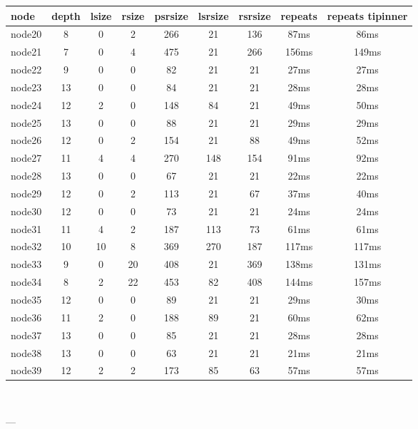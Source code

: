 \begin{tabular}{|l|c|c|c|c|c|c|c|c|}
\hline node & depth & lsize & rsize & psrsize & lsrsize & rsrsize   & repeats & repeats tipinner\\
    \hline node20 & 8 & 0 & 2 & 266 & 21 & 136 & 87ms & 86ms\\
    \hline node21 & 7 & 0 & 4 & 475 & 21 & 266 & 156ms & 149ms\\
    \hline node22 & 9 & 0 & 0 & 82 & 21 & 21 & 27ms & 27ms\\
    \hline node23 & 13 & 0 & 0 & 84 & 21 & 21 & 28ms & 28ms\\
    \hline node24 & 12 & 2 & 0 & 148 & 84 & 21 & 49ms & 50ms\\
    \hline node25 & 13 & 0 & 0 & 88 & 21 & 21 & 29ms & 29ms\\
    \hline node26 & 12 & 0 & 2 & 154 & 21 & 88 & 49ms & 52ms\\
    \hline node27 & 11 & 4 & 4 & 270 & 148 & 154 & 91ms & 92ms\\
    \hline node28 & 13 & 0 & 0 & 67 & 21 & 21 & 22ms & 22ms\\
    \hline node29 & 12 & 0 & 2 & 113 & 21 & 67 & 37ms & 40ms\\
    \hline node30 & 12 & 0 & 0 & 73 & 21 & 21 & 24ms & 24ms\\
    \hline node31 & 11 & 4 & 2 & 187 & 113 & 73 & 61ms & 61ms\\
    \hline node32 & 10 & 10 & 8 & 369 & 270 & 187 & 117ms & 117ms\\
    \hline node33 & 9 & 0 & 20 & 408 & 21 & 369 & 138ms & 131ms\\
    \hline node34 & 8 & 2 & 22 & 453 & 82 & 408 & 144ms & 157ms\\
    \hline node35 & 12 & 0 & 0 & 89 & 21 & 21 & 29ms & 30ms\\
    \hline node36 & 11 & 2 & 0 & 188 & 89 & 21 & 60ms & 62ms\\
    \hline node37 & 13 & 0 & 0 & 85 & 21 & 21 & 28ms & 28ms\\
    \hline node38 & 13 & 0 & 0 & 63 & 21 & 21 & 21ms & 21ms\\
    \hline node39 & 12 & 2 & 2 & 173 & 85 & 63 & 57ms & 57ms\\

\hline
\end{tabular} \

---


